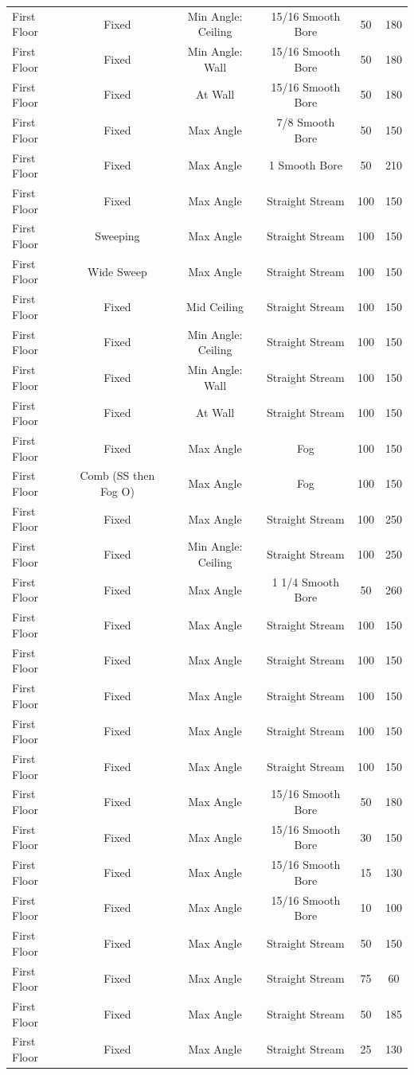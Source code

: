 \documentclass{article}
\begin{document}
\begin{table}[]
\begin{tabular}{lccccc}
First Floor & Fixed & Min Angle: Ceiling & 15/16 Smooth Bore & 50 & 180 \\
First Floor & Fixed & Min Angle: Wall & 15/16 Smooth Bore & 50 & 180 \\
First Floor & Fixed & At Wall & 15/16 Smooth Bore & 50 & 180 \\
First Floor & Fixed & Max Angle & 7/8 Smooth Bore & 50 & 150 \\
First Floor & Fixed & Max Angle & 1 Smooth Bore & 50 & 210 \\
First Floor & Fixed & Max Angle & Straight Stream & 100 & 150 \\
First Floor & Sweeping & Max Angle & Straight Stream & 100 & 150 \\
First Floor & Wide Sweep & Max Angle & Straight Stream & 100 & 150 \\
First Floor & Fixed & Mid Ceiling & Straight Stream & 100 & 150 \\
First Floor & Fixed & Min Angle: Ceiling & Straight Stream & 100 & 150 \\
First Floor & Fixed & Min Angle: Wall & Straight Stream & 100 & 150 \\
First Floor & Fixed & At Wall & Straight Stream & 100 & 150 \\
First Floor & Fixed & Max Angle & Fog & 100 & 150 \\
First Floor & Comb (SS then Fog O) & Max Angle & Fog & 100 & 150 \\
First Floor & Fixed & Max Angle & Straight Stream & 100 & 250 \\
First Floor & Fixed & Min Angle: Ceiling & Straight Stream & 100 & 250 \\
First Floor & Fixed & Max Angle & 1 1/4 Smooth Bore & 50 & 260 \\
First Floor & Fixed & Max Angle & Straight Stream & 100 & 150 \\
First Floor & Fixed & Max Angle & Straight Stream & 100 & 150 \\
First Floor & Fixed & Max Angle & Straight Stream & 100 & 150 \\
First Floor & Fixed & Max Angle & Straight Stream & 100 & 150 \\
First Floor & Fixed & Max Angle & Straight Stream & 100 & 150 \\
First Floor & Fixed & Max Angle & 15/16 Smooth Bore & 50 & 180 \\
First Floor & Fixed & Max Angle & 15/16 Smooth Bore & 30 & 150 \\
First Floor & Fixed & Max Angle & 15/16 Smooth Bore & 15 & 130 \\
First Floor & Fixed & Max Angle & 15/16 Smooth Bore & 10 & 100 \\
First Floor & Fixed & Max Angle & Straight Stream & 50 & 150 \\
First Floor & Fixed & Max Angle & Straight Stream & 75 & 60 \\
First Floor & Fixed & Max Angle & Straight Stream & 50 & 185 \\
First Floor & Fixed & Max Angle & Straight Stream & 25 & 130 \\ 
\bottomrule[1.25pt]
\end{tabular}
\end{table}
\end{document}
